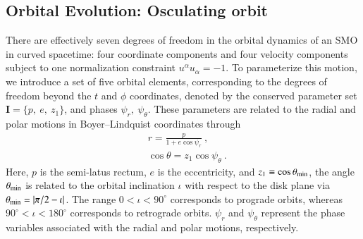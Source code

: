 \documentclass[aps,prx,reprint,superscriptaddress,nofootinbib,longbibliography]{revtex4-1}
\begin{document}
\subsection{Orbital Evolution: Osculating orbit}\label{sec:parameter evolution}
There are effectively seven degrees of freedom in the orbital dynamics of an SMO in curved spacetime: four coordinate components and four velocity components subject to one normalization constraint $u^{\alpha} u_{\alpha}=-1$. To parameterize this motion, we introduce a set of five orbital elements, corresponding to the degrees of freedom beyond the $t$ and $\phi$ coordinates, denoted by the conserved parameter set $\mathbf{I}=\{p,\ e,\ z_{1}\}$, and phases $\psi_{r},\ \psi_{\theta}$. These parameters are related to the radial and polar motions in Boyer–Lindquist coordinates through
\begin{equation}
\begin{aligned}
    &r=\frac{p}{1+e\cos\psi_{r}}\ , \\
    &\cos\theta =z_{1}\cos\psi_{\theta}\ .
    \label{eq:r theta Kepler}
\end{aligned}
\end{equation}
Here, $p$ is the semi-latus rectum, $e$ is the eccentricity, and $z_{1}\equiv \cos\theta_{\rm min}$, the angle $\theta_{\rm min}$ is related to the orbital inclination $\iota$ with respect to the disk plane via $\theta_{\rm min}=\abs{\pi/2 - \iota}$. The range $0<\iota<90^{\circ}$ corresponds to prograde orbits, whereas $90^{\circ}<\iota<180^{\circ}$ corresponds to retrograde orbits.  $\psi_{r}$ and $\psi_{\theta}$ represent the phase variables associated with the radial and polar motions, respectively.\par
\end{document}
